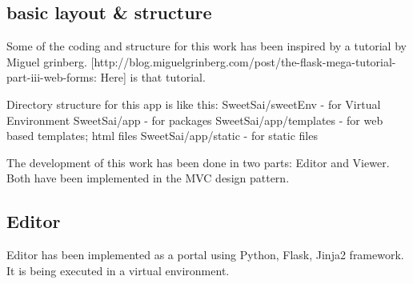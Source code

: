 \documentclass[11pt]{article}
\begin{document}
\subsection{basic layout \& structure}
\label{sec-4-1}

Some of the coding and structure for this work has been inspired by a
tutorial by Miguel grinberg. 
[http://blog.miguelgrinberg.com/post/the-flask-mega-tutorial-part-iii-web-forms:
Here] is that tutorial.

Directory structure for this app is like this:
SweetSai/sweetEnv - for Virtual Environment
SweetSai/app - for packages
SweetSai/app/templates - for web based templates; html files
SweetSai/app/static - for static files


The development of this work has been done in two parts: Editor and
Viewer. Both have been implemented in the MVC design pattern.
\subsection{Editor}
\label{sec-4-2}

Editor has been implemented as a portal using Python, Flask, Jinja2
framework. It is being executed in a virtual environment. 
\end{document}
